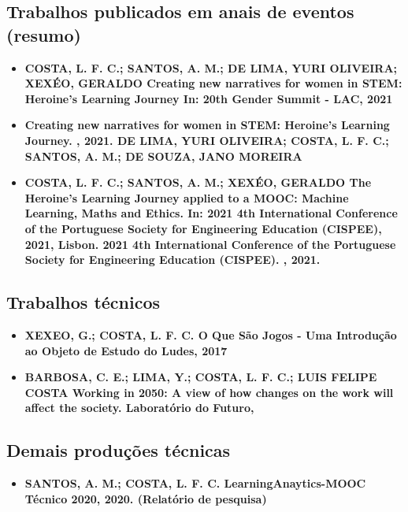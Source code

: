 \subsection{Trabalhos publicados em anais de eventos (resumo)}


\begin {itemize}
    \item\textbf {COSTA, L. F. C.; SANTOS, A. M.; DE LIMA, YURI OLIVEIRA; XEXÉO, GERALDO
Creating new narratives for women in STEM: Heroine's Learning Journey In: 20th Gender Summit - LAC,
2021}
    \item\textbf {Creating new narratives for women in STEM: Heroine's Learning Journey. , 2021.
DE LIMA, YURI OLIVEIRA; COSTA, L. F. C.; SANTOS, A. M.; DE SOUZA, JANO MOREIRA}
     \item\textbf {COSTA, L. F. C.; SANTOS, A. M.; XEXÉO, GERALDO
The Heroine's Learning Journey applied to a MOOC: Machine Learning, Maths and Ethics. In: 2021 4th
International Conference of the Portuguese Society for Engineering Education (CISPEE), 2021, Lisbon.
2021 4th International Conference of the Portuguese Society for Engineering Education (CISPEE).
, 2021.}
\end {itemize}


\subsection{Trabalhos técnicos}

\begin {itemize}
    \item\textbf {XEXEO, G.; COSTA, L. F. C.
O Que São Jogos - Uma Introdução ao Objeto de Estudo do Ludes, 2017}
    \item\textbf {BARBOSA, C. E.; LIMA, Y.; COSTA, L. F. C.; LUIS FELIPE COSTA
Working in 2050: A view of how changes on the work will affect the society. Laboratório do Futuro,}
\end {itemize}

\subsection{Demais produções técnicas}


\begin {itemize}
    \item\textbf {SANTOS, A. M.; COSTA, L. F. C.
LearningAnaytics-MOOC Técnico 2020, 2020. (Relatório de pesquisa)}
\end {itemize}




